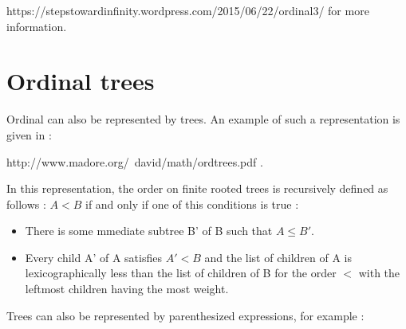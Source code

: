 \documentclass[10pt]{article}
\begin{document}
https://stepstowardinfinity.wordpress.com/2015/06/22/ordinal3/ for more information. 

\section{Ordinal trees}

Ordinal can also be represented by trees. An example of such a representation is given in :

http://www.madore.org/~david/math/ordtrees.pdf .

In this representation, the order on finite rooted trees is recursively defined as follows : \( A < B \) if and only if one of this conditions is true :

\begin{itemize}
     \setlength{\itemsep}{1pt}
     \setlength{\parskip}{0pt}
     \setlength{\parsep}{0pt}
\item There is some mmediate subtree B' of B such that \( A \leq B' \).
\item Every child A' of A satisfies \( A' < B \) and the list of children of A is lexicographically less than the list of children of B for the order \( < \) with the leftmost children having the most weight.
\end{itemize}

Trees can also be represented by parenthesized expressions, for example :
\end{document}
